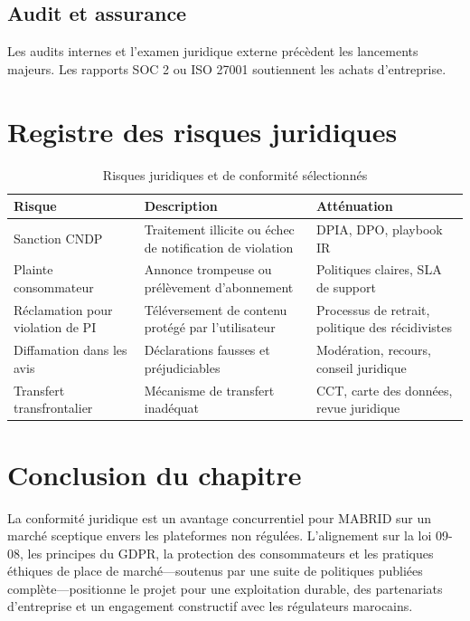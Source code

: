 \subsection{Audit et assurance}

Les audits internes et l'examen juridique externe précèdent les lancements majeurs. Les rapports SOC 2 ou ISO 27001 soutiennent les achats d'entreprise.


\section{Registre des risques juridiques}

\begin{table}[H]
  \centering
  \caption{Risques juridiques et de conformité sélectionnés}
  \label{tab:legal-risk}
  \begin{tabularx}{\textwidth}{@{}lXl@{}}
    \toprule
    \textbf{Risque} & \textbf{Description} & \textbf{Atténuation} \\
    \midrule
    Sanction CNDP & Traitement illicite ou échec de notification de violation & DPIA, DPO, playbook IR \\
    Plainte consommateur & Annonce trompeuse ou prélèvement d'abonnement & Politiques claires, SLA de support \\
    Réclamation pour violation de PI & Téléversement de contenu protégé par l'utilisateur & Processus de retrait, politique des récidivistes \\
    Diffamation dans les avis & Déclarations fausses et préjudiciables & Modération, recours, conseil juridique \\
    Transfert transfrontalier & Mécanisme de transfert inadéquat & CCT, carte des données, revue juridique \\
    \bottomrule
  \end{tabularx}
\end{table}

\section{Conclusion du chapitre}

La conformité juridique est un avantage concurrentiel pour MABRID sur un marché sceptique envers les plateformes non régulées. L'alignement sur la loi 09-08, les principes du GDPR, la protection des consommateurs et les pratiques éthiques de place de marché---soutenus par une suite de politiques publiées complète---positionne le projet pour une exploitation durable, des partenariats d'entreprise et un engagement constructif avec les régulateurs marocains.
